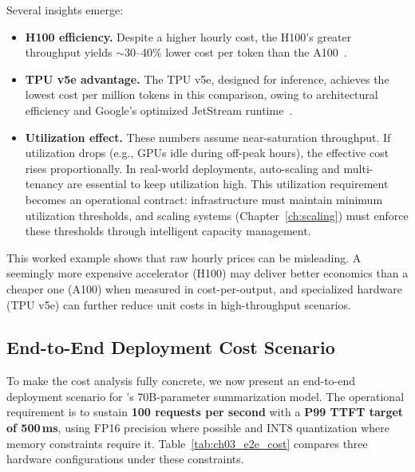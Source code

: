 Several insights emerge:
\begin{itemize}
    \item \textbf{H100 efficiency.} Despite a higher hourly cost, the H100’s greater throughput yields $\sim$30–40\% lower cost per token than the A100~\cite{nvidia-h100-arch}.
    \item \textbf{TPU v5e advantage.} The TPU v5e, designed for inference, achieves the lowest cost per million tokens in this comparison, owing to architectural efficiency and Google’s optimized JetStream runtime~\cite{jouppi2023-tpuv4}.
    \item \textbf{Utilization effect.} These numbers assume near-saturation throughput. If utilization drops (e.g., GPUs idle during off-peak hours), the effective cost rises proportionally. In real-world deployments, auto-scaling and multi-tenancy are essential to keep utilization high. This utilization requirement becomes an operational contract: infrastructure must maintain minimum utilization thresholds, and scaling systems (Chapter~\ref{ch:scaling}) must enforce these thresholds through intelligent capacity management.
\end{itemize}

This worked example shows that raw hourly prices can be misleading. A seemingly more expensive accelerator (H100) may deliver better economics than a cheaper one (A100) when measured in cost-per-output, and specialized hardware (TPU v5e) can further reduce unit costs in high-throughput scenarios.

\subsection{End-to-End Deployment Cost Scenario}
\label{sec:infra-cost-scenario}

To make the cost analysis fully concrete, we now present an end-to-end deployment scenario for \ishtar{}'s 70B-parameter summarization model. The operational requirement is to sustain \textbf{100 requests per second} with a \textbf{P99 TTFT target of 500\,ms}, using FP16 precision where possible and INT8 quantization where memory constraints require it. Table~\ref{tab:ch03_e2e_cost} compares three hardware configurations under these constraints.

